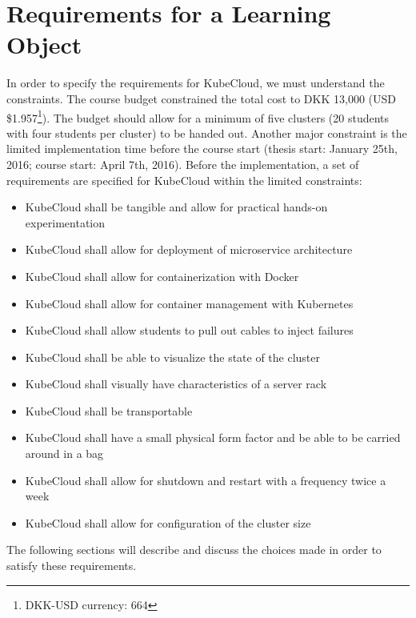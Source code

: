 \section{Requirements for a Learning Object}
In order to specify the requirements for KubeCloud, we must understand the constraints. The course budget constrained the total cost to DKK 13,000 (USD \$1.957\footnote{DKK-USD currency: 664}). The budget should allow for a minimum of five clusters (20 students with four students per cluster) to be handed out. Another major constraint is the limited implementation time before the course start (thesis start: January 25th, 2016; course start: April 7th, 2016). Before the implementation, a set of requirements are specified for KubeCloud within the limited constraints:

\begin{itemize}
\setlength\itemsep{0.05em}
  \item KubeCloud shall be tangible and allow for practical hands-on experimentation
  \item KubeCloud shall allow for deployment of microservice architecture
  \item KubeCloud shall allow for containerization with Docker
  \item KubeCloud shall allow for container management with Kubernetes
  \item KubeCloud shall allow students to pull out cables to inject failures
  \item KubeCloud shall be able to visualize the state of the cluster
  \item KubeCloud shall visually have characteristics of a server rack
  \item KubeCloud shall be transportable 
  \item KubeCloud shall have a small physical form factor and be able to be carried around in a bag
  \item KubeCloud shall allow for shutdown and restart with a frequency twice a week
  \item KubeCloud shall allow for configuration of the cluster size
\end{itemize}

\noindent
The following sections will describe and discuss the choices made in order to satisfy these requirements.